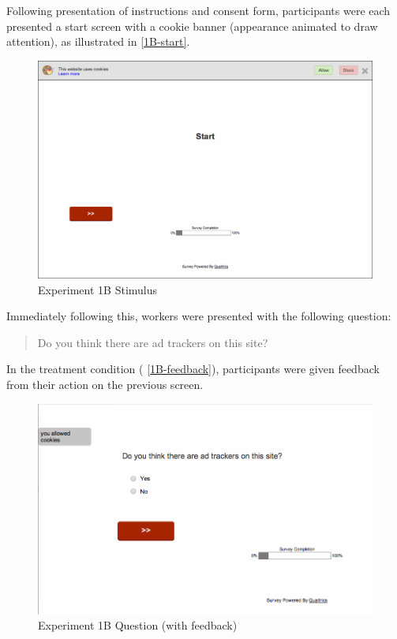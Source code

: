 Following presentation of instructions and consent form, participants were each presented a start screen with a cookie banner (appearance animated to draw attention), as illustrated in  \autoref{1B-start}. 

\begin{figure}
\centerline{
  \includegraphics[scale=.3]{chapter5.tex/1b-start}
  }
\caption{Experiment 1B Stimulus}
\label{1B-start}
\end{figure}

Immediately following this, workers were presented with the following question:

\begin{quote}
Do you think there are ad trackers on this site?
\end{quote}


In the treatment condition ( \autoref{1B-feedback}),  participants were given feedback from their action on the previous screen.

\begin{figure}
\centerline{
  \includegraphics[scale=.4]{chapter5.tex/1b-feedback}
  }
\caption{Experiment 1B Question (with feedback)}
\label{1B-feedback}
\end{figure}

